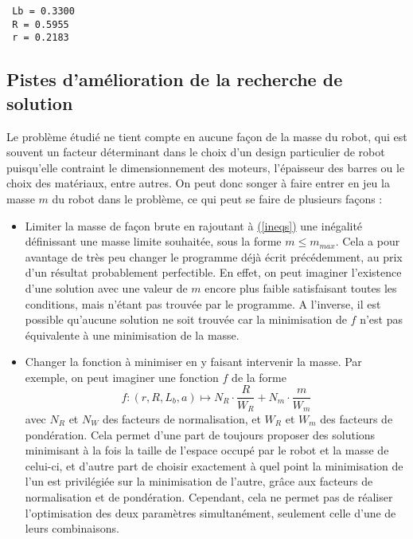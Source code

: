 \documentclass{article}
\begin{document}
\begin{multicols*}{2}
\begin{verbatim}
 Lb = 0.3300
 R = 0.5955
 r = 0.2183
\end{verbatim}

\subsection*{Pistes d'amélioration de la recherche de solution}
Le problème étudié ne tient compte en aucune façon de la masse du robot, qui est souvent un facteur déterminant dans le choix d'un design particulier de robot puisqu'elle contraint le dimensionnement des moteurs, l'épaisseur des barres ou le choix des matériaux, entre autres. On peut donc songer à faire entrer en jeu la masse $m$ du robot dans le problème, ce qui peut se faire de plusieurs façons :

\begin{itemize}
    \item Limiter la masse de façon brute en rajoutant à \hyperref[ineqs]{(\ref{ineqs})} une inégalité définissant une masse limite souhaitée, sous la forme $m \leq m_{max}$. Cela a pour avantage de très peu changer le programme déjà écrit précédemment, au prix d'un résultat probablement perfectible. En effet, on peut imaginer l'existence d'une solution avec une valeur de $m$ encore plus faible satisfaisant toutes les conditions, mais n'étant pas trouvée par le programme. A l'inverse, il est possible qu'aucune solution ne soit trouvée car la minimisation de $f$ n'est pas équivalente à une minimisation de la masse.
    
    \item Changer la fonction à minimiser en y faisant intervenir la masse. Par exemple, on peut imaginer une fonction $f$ de la forme
    \begin{equation}
         f \colon (r,R,L_b,a) \mapsto N_R \cdot \frac{R}{W_R}+ N_m \cdot \frac{m}{W_m}
    \end{equation}
    avec $N_R$ et $N_W$ des facteurs de normalisation, et $W_R$ et $W_m$ des facteurs de pondération. Cela permet d'une part de toujours proposer des solutions minimisant à la fois la taille de l'espace occupé par le robot et la masse de celui-ci, et d'autre part de choisir exactement à quel point la minimisation de l'un est privilégiée sur la minimisation de l'autre, grâce aux facteurs de normalisation et de pondération. Cependant, cela ne permet pas de réaliser l'optimisation des deux paramètres simultanément, seulement celle d'une de leurs combinaisons.
    

\end{itemize}
\end{multicols*}
\end{document}
